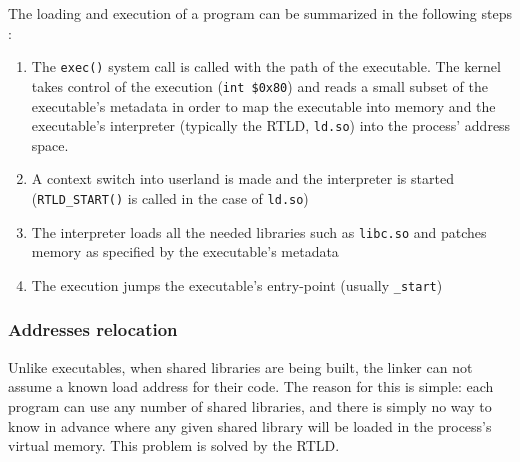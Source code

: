 \documentclass[11pt,twoside,a4paper]{article}
\begin{document}
The loading and execution of a program can be summarized in the following steps \cite{eresi}:
\begin{enumerate}
\item The \texttt{exec()} system call is called with the path of the executable. The kernel takes control of the execution (\texttt{int \$0x80}) and reads a small subset of the executable's metadata in order to map the executable into memory and the executable's interpreter (typically the RTLD, \texttt{ld.so}) into the process' address space.
\item A context switch into userland is made and the interpreter is started (\texttt{RTLD\_START()} is called in the case of \texttt{ld.so})
\item The interpreter loads all the needed libraries such as \texttt{libc.so} and patches memory as specified by the executable's metadata
\item The execution jumps the executable's entry-point (usually \texttt{\_start})
\end{enumerate}

\subsubsection{Addresses relocation} 

Unlike executables, when shared libraries are being built, the linker can not assume a known load address for their code. The reason for this is simple: each program can use any number of shared libraries, and there is simply no way to know in advance where any given shared library will be loaded in the process's virtual memory. This problem is solved by the RTLD.
\end{document}
